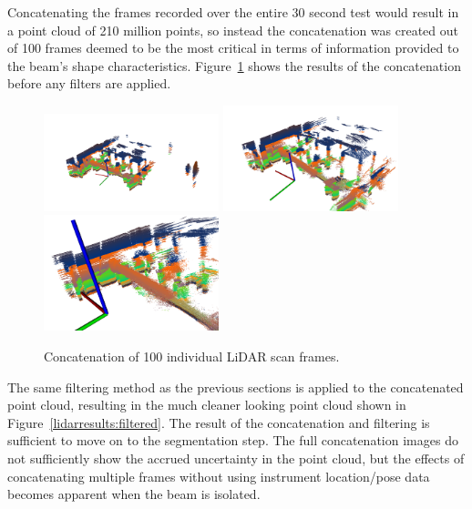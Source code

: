 \documentclass[12pt]{drexelthesis}
\begin{document}
Concatenating the frames recorded over the entire 30 second test would result in a point cloud of 210 million points, so instead the concatenation was created out of 100 frames deemed to be the most critical in terms of information provided to the beam's shape characteristics. Figure~\ref{lidarresults:concatenated} shows the results of the concatenation before any filters are applied.


\begin{figure}[!ht]
	\centering
		\includegraphics[width=2in]{images/real-lab-scans/rawscan0.png}
		\includegraphics[width=2in]{images/real-lab-scans/rawscan1.png}
		\includegraphics[width=2in]{images/real-lab-scans/rawscan2.png}
		\caption[Concatenation of 100 individual LiDAR scan frames]{\centering Concatenation of 100 individual LiDAR scan frames.}
	\label{lidarresults:concatenated}
\end{figure}

The same filtering method as the previous sections is applied to the concatenated point cloud, resulting in the much cleaner looking point cloud shown in Figure~\ref{lidarresults:filtered}. The result of the concatenation and filtering is sufficient to move on to the segmentation step. The full concatenation images do not sufficiently show the accrued uncertainty in the point cloud, but the effects of concatenating multiple frames without using instrument location/pose data becomes apparent when the beam is isolated.
\end{document}
